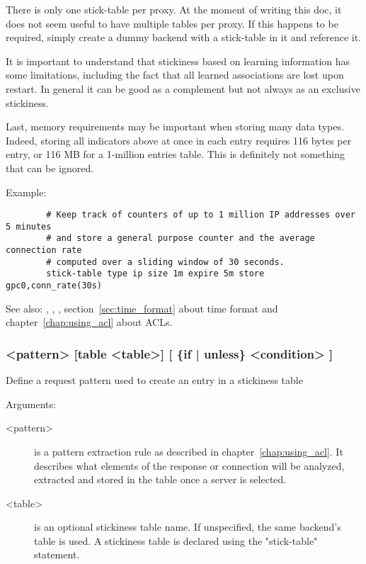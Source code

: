 {  There is only one stick-table per proxy. At the moment of writing this doc,
  it does not seem useful to have multiple tables per proxy. If this happens
  to be required, simply create a dummy backend with a stick-table in it and
  reference it.

  It is important to understand that stickiness based on learning information
  has some limitations, including the fact that all learned associations are
  lost upon restart. In general it can be good as a complement but not always
  as an exclusive stickiness.

  Last, memory requirements may be important when storing many data types.
  Indeed, storing all indicators above at once in each entry requires 116 bytes
  per entry, or 116 MB for a 1-million entries table. This is definitely not
  something that can be ignored.

  Example:
  \begin{verbatim}
        # Keep track of counters of up to 1 million IP addresses over 5 minutes
        # and store a general purpose counter and the average connection rate
        # computed over a sliding window of 30 seconds.
        stick-table type ip size 1m expire 5m store gpc0,conn_rate(30s)
  \end{verbatim}

  See also: , , , section~\ref{sec:time_format}
             about time format and chapter~\ref{chap:using_acl} about ACLs.

\subsubsection[stick store-response]{ <pattern> [table <table>] [ \{if | unless\} <condition> ]}

  Define a request pattern used to create an entry in a stickiness table
  

  Arguments:
  \begin{description}
  \item[<pattern>] is a pattern extraction rule as described in chapter~\ref{chap:using_acl}. It
               describes what elements of the response or connection will
               be analyzed, extracted and stored in the table once a
               server is selected.

  \item[<table>] is an optional stickiness table name. If unspecified, the same
               backend's table is used. A stickiness table is declared using
               the "stick-table" statement.


\end{description}}
